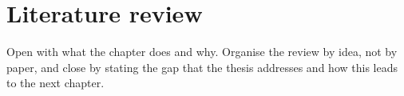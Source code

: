 \chapter{Literature review}

Open with what the chapter does and why. Organise the review by idea, not by paper, and close by stating the gap that the thesis addresses and how this leads to the next chapter.

